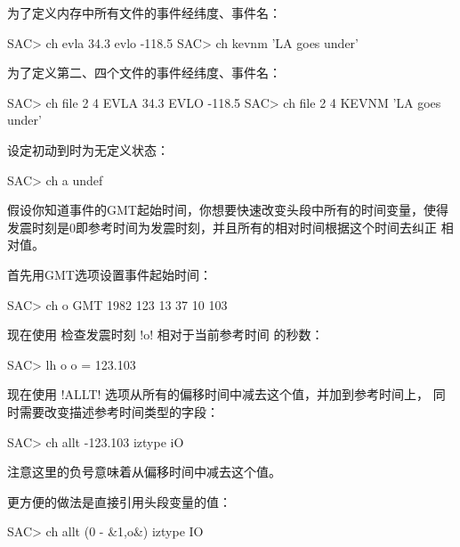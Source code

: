 为了定义内存中所有文件的事件经纬度、事件名：
\begin{SACCode}
SAC> ch evla 34.3 evlo -118.5
SAC> ch kevnm 'LA goes under'
\end{SACCode}

为了定义第二、四个文件的事件经纬度、事件名：
\begin{SACCode}
SAC> ch file 2 4 EVLA 34.3 EVLO -118.5
SAC> ch file 2 4 KEVNM 'LA goes under'
\end{SACCode}

设定初动到时为无定义状态：
\begin{SACCode}
SAC> ch a undef
\end{SACCode}

假设你知道事件的GMT起始时间，你想要快速改变头段中所有的时间变量，使得
发震时刻是0即参考时间为发震时刻，并且所有的相对时间根据这个时间去纠正
相对值。

首先用GMT选项设置事件起始时间：
\begin{SACCode}
SAC> ch o GMT 1982 123 13 37 10 103
\end{SACCode}
现在使用  检查发震时刻 !o! 相对于当前参考时间
的秒数：
\begin{SACCode}
SAC> lh o
 o = 123.103
\end{SACCode}
现在使用 !ALLT! 选项从所有的偏移时间中减去这个值，并加到参考时间上，
同时需要改变描述参考时间类型的字段：
\begin{SACCode}
SAC> ch allt -123.103 iztype iO
\end{SACCode}
注意这里的负号意味着从偏移时间中减去这个值。

更方便的做法是直接引用头段变量的值：
\begin{SACCode}
SAC> ch allt (0 - &1,o&) iztype IO
\end{SACCode}
